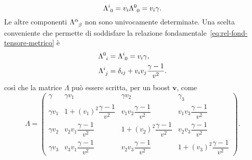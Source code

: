 \begin{equation}
  \tensor{\Lambda}{^{i}_{0}} = v_{i}\tensor{\Lambda}{^{0}_{0}} = v_{i}\gamma.
\end{equation}
Le altre componenti $\tensor{\Lambda}{^{\alpha}_{\beta}}$ non sono univocamente
determinate.  Una scelta conveniente che permette di soddisfare
la relazione fondamentale~\eqref{eq:rel-fond-tensore-metrico} è
\begin{subequations}
  \begin{align}
    \tensor{\Lambda}{^{0}_{i}} &= \tensor{\Lambda}{^{i}_{0}} = v_{i}\gamma, \\
    \tensor{\Lambda}{^{i}_{j}} &= \delta_{ij} +
    v_{i}v_{j}\frac{\gamma-1}{v^{2}}.
  \end{align}
\end{subequations}
così che la matrice $\Lambda$ può essere scritta, per un boost
$\bm{v}$, come
\begin{equation}
  \Lambda =
  \begin{pmatrix}
    \gamma & \gamma v_{1} & \gamma v_{2} & \gamma _{3} \\[2.0ex]
    \gamma v_{1} & 1 + (v_{1})^{2}\dfrac{\gamma-1}{v^{2}} &
    v_{1}v_{2}\dfrac{\gamma-1}{v^{2}} & v_{1} v_{3}\dfrac{\gamma-1}{v^{2}}
    \\[2.0ex]
    \gamma v_{2} & v_{2}v_{1}\dfrac{\gamma-1}{v^{2}} & 1 +
    (v_{2})^{2}\dfrac{\gamma-1}{v^{2}} & v_{2}v_{3}\dfrac{\gamma-1}{v^{2}}
    \\[2.0ex]
    \gamma v_{3} & v_{3}v_{1}\dfrac{\gamma-1}{v^{2}} &
    v_{2}v_{3}\dfrac{\gamma-1}{v^{2}} & 1 + (v_{3})^{2}\dfrac{\gamma-1}{v^{2}}
  \end{pmatrix}.
\end{equation}

